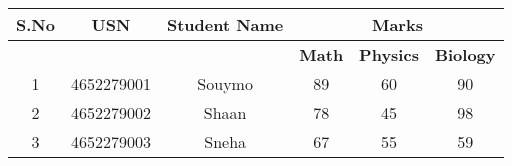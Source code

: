 \documentclass{article}
\begin{document}
\begin{tabular}{|c|c|c|c|c|c|}
\hline
\textbf{S.No} & \textbf{USN} & \textbf{Student Name} & \multicolumn{3}{c|}{\textbf{Marks}} \\ \hline
              &              &                       & \textbf{Math} & \textbf{Physics} & \textbf{Biology} \\ \hline
1             & 4652279001   & Souymo                & 89                & 60                & 90                \\ \hline
2             & 4652279002   & Shaan                 & 78                & 45                & 98                \\ \hline
3             & 4652279003   & Sneha                 & 67                & 55                & 59                \\ \hline
\end{tabular}
\end{document}
